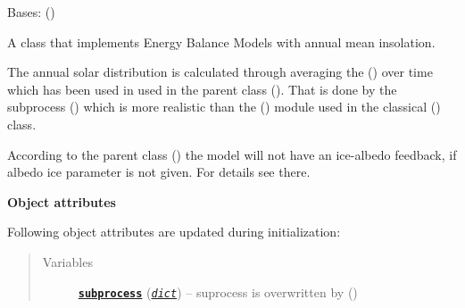 \documentclass[a4paper,10pt,english]{sphinxmanual}
\begin{document}

\begin{fulllineitems}
\label{api/climlab.model:climlab.model.ebm.EBM_annual}
Bases: {\hyperref[api/climlab.model:climlab.model.ebm.EBM_seasonal]{\emph{}}} ()

A class that implements Energy Balance Models with annual mean insolation.

The annual solar distribution is calculated through averaging the 
{\hyperref[api/climlab.radiation:climlab.radiation.insolation.DailyInsolation]{\emph{}}} () over time 
which has been used in used in the parent class
{\hyperref[api/climlab.model:climlab.model.ebm.EBM_seasonal]{\emph{}}} (). That is done by the subprocess
{\hyperref[api/climlab.radiation:climlab.radiation.insolation.AnnualMeanInsolation]{\emph{}}} () which is
more realistic than the {\hyperref[api/climlab.radiation:climlab.radiation.insolation.P2Insolation]{\emph{}}} ()
module used in the classical {\hyperref[api/climlab.model:climlab.model.ebm.EBM]{\emph{}}} () class.

According to the parent class {\hyperref[api/climlab.model:climlab.model.ebm.EBM_seasonal]{\emph{}}} ()
the model will not have an ice-albedo feedback, if albedo ice parameter
 is not given. For details see there.

\textbf{Object attributes}

Following object attributes are updated during initialization:
\begin{quote}\begin{description}
\item[{Variables}] \leavevmode
\href{http://docs.python.org/2.7/library/subprocess.html\#module-subprocess}{\textbf{\texttt{subprocess}}} (\href{http://docs.python.org/2.7/library/stdtypes.html\#dict}{\emph{\texttt{dict}}}) -- suprocess  is overwritten by
{\hyperref[api/climlab.radiation:climlab.radiation.insolation.AnnualMeanInsolation]{\emph{}}} ()


\end{description}
\end{quote}
\end{fulllineitems}
\end{document}
